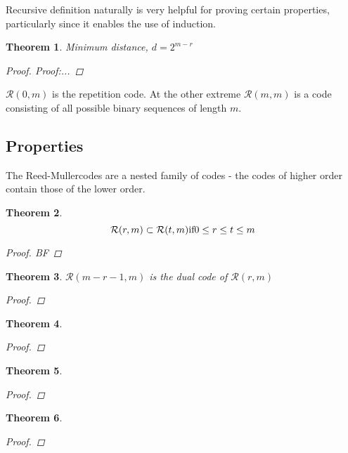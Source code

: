 \documentclass{article}
\newcommand{\RM}[2]{\ensuremath{\mathcal{R}(#1,#2)}}
\newcommand{\rem}{Reed-Muller}
\newtheorem{thm}{Theorem}
\begin{document}
Recursive definition naturally is very helpful for proving certain properties, particularly since it enables the use of induction.

\begin{thm}
Minimum distance, $d=2^{m-r}$
\begin{proof}
Proof:...
\end{proof}
\end{thm}

$\RM{0}{m} $ is the repetition code. At the other extreme $\RM{m}{m}$ is a code consisting of all possible binary sequences of length $m$.
\subsection{Properties}

The \rem codes are a nested family of codes - the codes of higher order contain those of the lower order.
\begin{thm}
\begin{equation*}
\RM{r}{m} \subset \RM{t}{m} 
\text{if} 0 \leq r \leq t \leq m \\
\end{equation*}

\begin{proof}
BF
\end{proof}
\end{thm}



\begin{thm}
$\RM{m-r-1}{m}$ is the dual code of $\RM{r}{m}$
\begin{proof}
\end{proof}
\end{thm}

\begin{thm}

\begin{proof}
\end{proof}
\end{thm}


\begin{thm}

\begin{proof}
\end{proof}
\end{thm}


\begin{thm}

\begin{proof}
\end{proof}
\end{thm}
\end{document}
